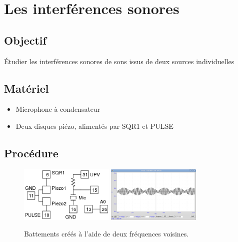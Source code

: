 \documentclass{book}
\begin{document}




\section{Les interférences sonores}


 \label{sec:Interference-of-sound}

\subsection{Objectif}


Étudier les interférences sonores de sons issus de deux sources individuelles




\subsection{Matériel}


\begin{itemize}
  \item Microphone à condensateur
  \item Deux disques piézo, alimentés par SQR1 et PULSE
\end{itemize}

\subsection{Procédure}


\begin{figure}[h!]
\begin{center}
\caption{\label{fig:SoundBeats}Battements créés à l'aide de deux fréquences voisines. }\vspace{0.5em}
\includegraphics[width=0.4\textwidth, height=0.3\textwidth, keepaspectratio]{Schematic-sound-beats.png}
\includegraphics[width=0.4\textwidth, height=0.3\textwidth, keepaspectratio]{Pic-sound-beats.png}
\end{center}
\end{figure}
\end{document}
